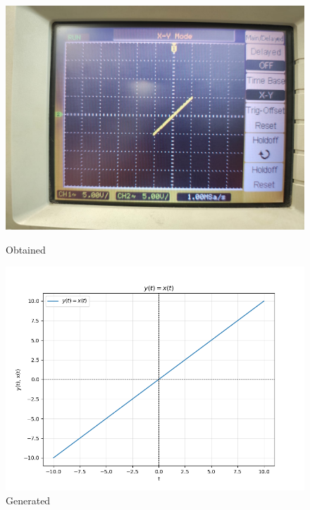 \documentclass[a4paper,12pt]{article}
\numberwithin{equation}{section} %
\begin{document}
\begin{figure}[htbp]
    \centering
    \begin{minipage}{0.45\textwidth}
        \centering
        \includegraphics[width=\linewidth]{Graphs/Graph1.jpeg}
        \caption{Obtained}
    \end{minipage}
    \hfill
    \begin{minipage}{0.45\textwidth}
        \centering
        \includegraphics[width=\linewidth]{Python plots/lab3.png} 
        \caption{Generated}
    \end{minipage}
\end{figure}
\newpage
\end{document}
